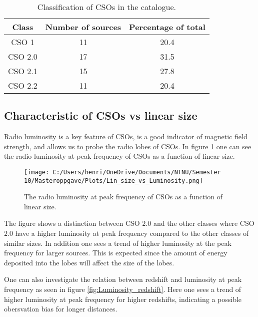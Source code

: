 \begin{table}
\begin{tabular}{@{}ccccccccc@{}}
     
    \end{tabular}
\end{table}


\begin{table}
    \caption{Classification of CSOs in the catalogue.}
    \label{tab:CSO_class}
    \centering
    \begin{tabular}{@{}ccc@{}}
        \toprule
        Class & Number of sources & Percentage of total  \\ \midrule
        CSO 1 & 11 & 20.4  \\
        CSO 2.0 & 17 & 31.5  \\
        CSO 2.1 & 15 & 27.8  \\
        CSO 2.2 & 11 & 20.4  \\
        \bottomrule
    \end{tabular}
\end{table}
\newpage

\subsection{Characteristic of CSOs vs linear size}
Radio luminosity is a key feature of CSOs, is a good indicator of magnetic field strength, and allows us 
to probe the radio lobes of CSOs. In figure \ref{fig:Luminosity_size} one can see the radio luminosity at peak frequency of CSOs as a function of linear size. 

\begin{figure}
    \centering
    \texttt{[image: C:/Users/henri/OneDrive/Documents/NTNU/Semester 10/Masteroppgave/Plots/Lin\_size\_vs\_Luminosity.png]}
    \caption{The radio luminosity at peak frequency of CSOs as a function of linear size.}
    \label{fig:Luminosity_size}
\end{figure}

The figure shows a distinction between CSO $2.0$ and the other classes where CSO $2.0$ have a higher luminosity at peak frequency compared to the other classes of similar sizes. In addition one sees a trend of higher luminosity at the peak frequency for larger sources. This is expected since the amount of energy deposited into the lobes will 
 affect the size of the lobes.

One can also investigate the relation between redshift and luminosity at peak frequency as seen in figure \ref{fig:Luminosity_redshift}. Here one sees a trend of higher luminosity at peak frequency for higher redshifts, indicating a possible obersvation bias for longer distances.



